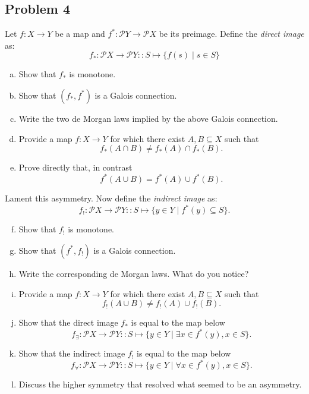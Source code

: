 \documentclass{amsart}
\begin{document}
\vspace{5 mm}

\subsection{Problem 4}
Let $f:X\to Y$ be a map and $f^*:\mathcal{P}Y\to\mathcal{P}X$ be its preimage.
\noindent Define the \emph{direct image} as:
    \[f_*:\mathcal{P}X\to\mathcal{P}Y::S\mapsto\{f(s)\mid s\in S\}\]
    
\begin{enumerate}[(a)]
    \item Show that $f_{*}$ is monotone.
    \item Show that $(f_*,f^{*})$ is a Galois connection.
    \item Write the two de Morgan laws implied by the above Galois connection.
    \item Provide a map $f:X\to Y$ for which there exist $A,B\subseteq X$ such that
    \[f_*(A\cap B)\neq f_*(A)\cap f_*(B).\]
    \item Prove directly that, in contrast
    \[f^*(A\cup B)=f^*(A)\cup f^*(B).\]
    \end{enumerate}
\noindent Lament this asymmetry. Now define the \emph{indirect image} as:
     \[f_{!}:\mathcal{P}X\to\mathcal{P}Y::S\mapsto \{y\in Y\mid f^*(y)\subseteq S\}.\]

\begin{enumerate}[(a)]\setcounter{enumi}{5}
    \item Show that $f_{!}$ is monotone.
    \item Show that $(f^*,f_{!})$ is a Galois connection.
    \item Write the corresponding de Morgan laws. What do you notice?
    \item Provide a map $f:X\to Y$ for which there exist $A,B\subseteq X$ such that
    \[f_{!}(A\cup B)\neq f_{!}(A)\cup f_{!} (B).\]
    \item Show that the direct image $f_*$ is equal to the map below
    \[f_{\exists}:\mathcal{P}X\to\mathcal{P}Y::S\mapsto \{y\in Y\mid \exists x\in f^*(y), x\in S\}.\]
    \item Show that the indirect image $f_!$ is equal to the map below
   \[f_{\forall}:\mathcal{P}X\to\mathcal{P}Y::S\mapsto \{y\in Y\mid \forall x\in f^*(y),x\in S\}.\]
    \item Discuss the higher symmetry that resolved what seemed to be an asymmetry.
 
\end{enumerate}
\end{document}

